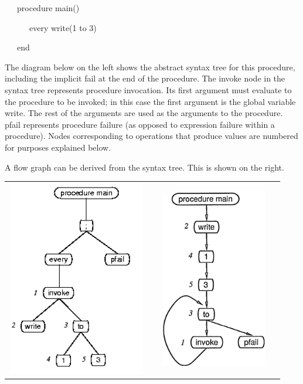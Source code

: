 {\ttfamily\mdseries
\ \ \ procedure main()}

{\ttfamily\mdseries
\ \ \ \ \ \ every write(1 to 3)}

{\ttfamily\mdseries
\ \ \ end}


The diagram below on the left shows the abstract syntax tree for this
procedure, including the implicit fail at the end of the
procedure. The invoke node in the syntax tree represents procedure
invocation. Its first argument must evaluate to the procedure to be
invoked; in this case the first argument is the global variable
write. The rest of the arguments are used as the arguments to the
procedure. pfail represents procedure failure (as opposed to
expression failure within a procedure). Nodes corresponding to
operations that produce values are numbered for purposes explained
below.

A flow graph can be derived from the syntax tree. This is shown on the right. 

\begin{flushleft}
\tablefirsthead{}
\tablehead{}
\tabletail{}
\tablelasttail{}
\begin{supertabular}{m{2.49766in}m{3.3448598in}}

\includegraphics[width=2.4in,height=3.4in]{kw/figure3-1.png}   &
\includegraphics[width=2.2in,height=3.1in]{kw/figure3-2.png}  \\
\end{supertabular}
\end{flushleft}

